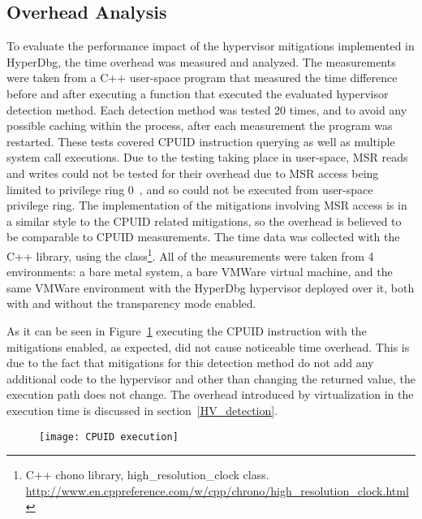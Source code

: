 \subsection{Overhead Analysis}
To evaluate the performance impact of the hypervisor mitigations implemented in HyperDbg, the time overhead was measured and analyzed. 
The measurements were taken from a C++ user-space program that measured the time difference before and after executing a function that executed the evaluated hypervisor detection method. 
Each detection method was tested 20 times, and to avoid any possible caching within the process, after each measurement the program was restarted. 
These tests covered CPUID instruction querying as well as multiple system call executions. Due to the testing taking place in user-space, 
MSR reads and writes could not be tested for their overhead due to MSR access being limited to privilege ring 0~\cite[Volume 2B]{Intel-SDM2025}, and so could not be executed from user-space privilege ring.
The implementation of the mitigations involving MSR access is in a similar style to the CPUID related mitigations, so the overhead is believed to be comparable to CPUID measurements.
The time data was collected with the C++  library, 
using the  class\footnote{C++ chono library, high\_resolution\_clock class. \url{http://www.en.cppreference.com/w/cpp/chrono/high_resolution_clock.html}}.
All of the measurements were taken from 4 environments: a bare metal system, a bare VMWare virtual machine, and the same 
VMWare environment with the HyperDbg hypervisor deployed over it, both with and without the transparency mode enabled.

As it can be seen in Figure~\ref{fig:cpuid_exec_time} executing the CPUID instruction with the mitigations enabled, as expected, did not cause noticeable time overhead. 
This is due to the fact that mitigations for this detection method do not add any additional code to the hypervisor and other than changing the returned value, the execution path does not change.
The overhead introduced by virtualization in the execution time is discussed in section~\ref{HV_detection}.
\begin{figure}[tbp]
    \texttt{[image: CPUID execution]} %
    \label{fig:cpuid_exec_time}
\end{figure}

